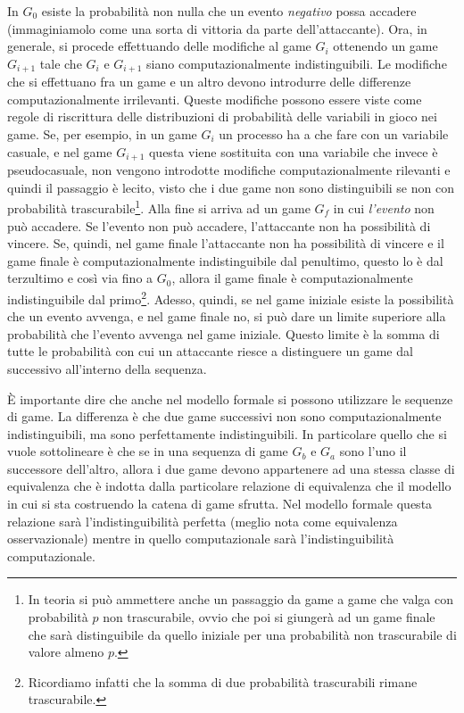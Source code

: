\documentclass[a4paper,openright,twoside,12pt]{report}
\begin{document}
In $G_0$ esiste la probabilit\`a non nulla che un evento \emph{negativo} possa accadere (immaginiamolo come una sorta di vittoria da parte dell'attaccante).
Ora, in generale, si procede effettuando delle modifiche al game $G_i$ ottenendo un game $G_{i+1}$ 
tale che $G_i$ e $G_{i+1}$ siano computazionalmente indistinguibili. Le modifiche che si effettuano fra un game e un altro devono introdurre delle differenze computazionalmente irrilevanti.
Queste modifiche possono essere viste come regole di riscrittura delle distribuzioni di probabilit\`a delle variabili in gioco nei game.
Se, per esempio, in un game $G_i$ un processo ha a che fare con un variabile casuale, e nel game $G_{i+1}$ questa viene sostituita con una variabile che invece \`e pseudocasuale, non vengono introdotte
modifiche computazionalmente rilevanti e quindi il passaggio \`e lecito, visto che i due game non sono distinguibili se non con 
probabilit\`a trascurabile\footnote{In teoria si pu\`o ammettere anche un passaggio da game a game che valga
con probabilit\`a $p$ non trascurabile, ovvio che poi si giunger\`a ad un game finale che sar\`a distinguibile 
da quello iniziale per una probabilit\`a non trascurabile di valore almeno $p$.}.
Alla fine si arriva ad un game $G_f$ in cui \emph{l'evento} non pu\`o accadere. Se l'evento non pu\`o accadere, l'attaccante non ha possibilit\`a di vincere. 
Se, quindi, nel game finale l'attaccante non ha possibilit\`a di vincere e il game finale
\`e computazionalmente indistinguibile dal penultimo, questo lo \`e dal terzultimo e cos\`i via fino a $G_0$, allora
il game finale \`e computazionalmente indistinguibile dal primo\footnote{Ricordiamo infatti che la somma di due probabilit\`a trascurabili rimane trascurabile.}. 
Adesso, quindi, se nel game iniziale esiste la possibilit\`a che un evento avvenga, e nel game finale no,
si pu\`o dare un limite superiore alla probabilit\`a che l'evento avvenga nel game iniziale. Questo limite \`e la somma di tutte le probabilit\`a con cui un attaccante riesce a distinguere un game dal successivo all'interno della sequenza.

\`E importante dire che anche nel modello formale si possono utilizzare le sequenze di game. La differenza \`e che due game successivi non sono computazionalmente indistinguibili, 
ma sono perfettamente indistinguibili. In particolare quello che si vuole sottolineare \`e che se in una sequenza di game $G_b$ e $G_a$ sono l'uno il successore dell'altro, 
allora i due game 
devono appartenere ad una stessa classe di equivalenza che \`e indotta dalla particolare relazione di equivalenza che il modello in cui si sta costruendo la catena di game sfrutta.
Nel modello formale questa relazione sar\`a l'indistinguibilit\`a perfetta (meglio nota come equivalenza osservazionale) mentre in quello computazionale sar\`a 
l'indistinguibilit\`a computazionale.
\end{document}
